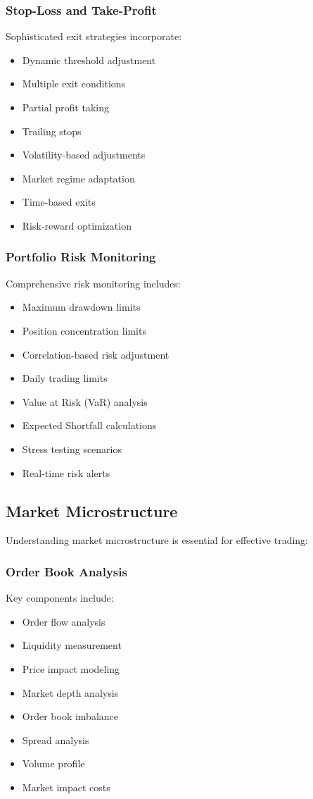 \documentclass[conference]{IEEEtran}
\begin{document}
\subsubsection{Stop-Loss and Take-Profit}
Sophisticated exit strategies incorporate:
\begin{itemize}
    \item Dynamic threshold adjustment
    \item Multiple exit conditions
    \item Partial profit taking
    \item Trailing stops
    \item Volatility-based adjustments
    \item Market regime adaptation
    \item Time-based exits
    \item Risk-reward optimization
\end{itemize}

\subsubsection{Portfolio Risk Monitoring}
Comprehensive risk monitoring includes:
\begin{itemize}
    \item Maximum drawdown limits
    \item Position concentration limits
    \item Correlation-based risk adjustment
    \item Daily trading limits
    \item Value at Risk (VaR) analysis
    \item Expected Shortfall calculations
    \item Stress testing scenarios
    \item Real-time risk alerts
\end{itemize}

\subsection{Market Microstructure}
Understanding market microstructure is essential for effective trading:

\subsubsection{Order Book Analysis}
Key components include:
\begin{itemize}
    \item Order flow analysis
    \item Liquidity measurement
    \item Price impact modeling
    \item Market depth analysis
    \item Order book imbalance
    \item Spread analysis
    \item Volume profile
    \item Market impact costs
\end{itemize}
\end{document}
